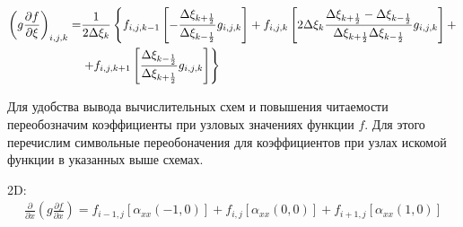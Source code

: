 \begin{equation*}
    \begin{split}
        \left(
            g
            \frac
                {\partial f}
                {\partial \xi}
        \right)_{i, j, k}
        =
        &
        \frac
            {1}
            {2 \Delta \xi_{k}}
        \left\{
            f_{i, j, k-1}
            \left[
                -
                \frac
                    {\Delta \xi_{k + \frac{1}{2}}}
                    {\Delta \xi_{k - \frac{1}{2}}}
                g_{i, j, k}
            \right]
            +
            f_{i, j, k}
            \left[
                2
                \Delta \xi_{k}
                \frac
                    {\Delta \xi_{k + \frac{1}{2}} - \Delta \xi_{k - \frac{1}{2}}}
                    {\Delta \xi_{k + \frac{1}{2}} \Delta \xi_{k - \frac{1}{2}}}
                g_{i, j, k}
            \right]
            +
        \right.
        \\
        &
        \left.
            +
            f_{i, j, k + 1}
            \left[
                \frac
                    {\Delta \xi_{k - \frac{1}{2}}}
                    {\Delta \xi_{k + \frac{1}{2}}}
                g_{i, j, k}
            \right]
        \right\}
    \end{split}
\end{equation*}

Для удобства вывода вычислительных схем и повышения
читаемости переобозначим коэффициенты при узловых значениях
функции $f$. Для этого перечислим символьные переобоначения
для коэффициентов при узлах искомой функции в указанных выше
схемах.

2D:
\begin{equation*}
    \begin{split}
        \frac
            {\partial}
            {\partial x}
        \left(
            g
            \frac
                {\partial f}
                {\partial x}
        \right)
        =
        f_{i-1,j}
        \left[
            \alpha_{xx} \left(-1, 0\right)
        \right]
        +
        f_{i,j}
        \left[
            \alpha_{xx} \left(0, 0\right)
        \right]
        +
        f_{i+1,j}
        \left[
            \alpha_{xx} \left(1, 0\right)
        \right]
    \end{split}
\end{equation*}

